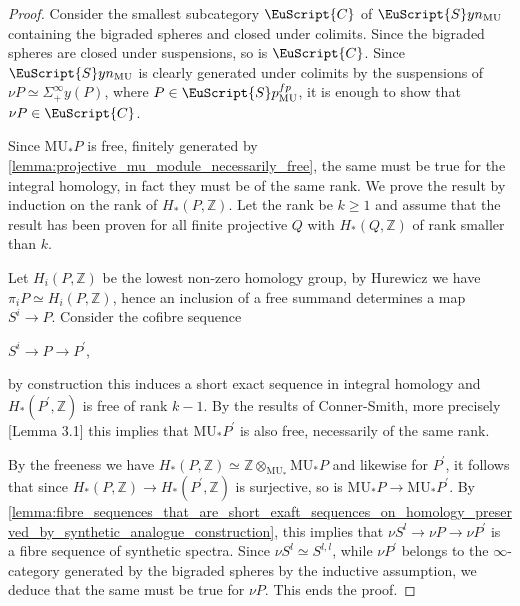 \documentclass[oneside,a4paper]{amsart}
\newcommand{\euscr}[1]{\EuScript{#1}} %
\newcommand{\ccat}{\euscr{C}} %
\newcommand{\MU}{\mathrm{MU}} %
\newcommand{\spectra}{\euscr{S}p} %
\newcommand{\synspectra}{\euscr{S}yn} %
\theoremstyle{plain}
\theoremstyle{definition}
\theoremstyle{remark}
\begin{document}
\begin{proof}
Consider the smallest subcategory $\ccat$ of $\synspectra_{\MU}$ containing the bigraded spheres and closed under colimits. Since the bigraded spheres are closed under suspensions, so is $\ccat$. Since $\synspectra_{\MU}$ is clearly generated under colimits by the suspensions of $\nu P \simeq \Sigma^{\infty}_{+} y(P)$, where $P \in \spectra_{\MU}^{fp}$, it is enough to show that $\nu P \in \ccat$. 

Since $\MU_{*}P$ is free, finitely generated by \cref{lemma:projective_mu_module_necessarily_free}, the same must be true for the integral homology, in fact they must be of the same rank. We prove the result by induction on the rank of $H_{*}(P, \mathbb{Z})$. Let the rank be $k \geq 1$ and assume that the result has been proven for all finite projective $Q$ with $H_{*}(Q, \mathbb{Z})$ of rank smaller than $k$.

Let $H_{i}(P, \mathbb{Z})$ be the lowest non-zero homology group, by Hurewicz we have $\pi_{i}P \simeq H_{i}(P, \mathbb{Z})$, hence an inclusion of a free summand determines a map $S^{i} \rightarrow P$. Consider the cofibre sequence

\begin{center}
$S^{i} \rightarrow P \rightarrow P^{\prime}$,
\end{center}
by construction this induces a short exact sequence in integral homology and $H_{*}(P^{\prime}, \mathbb{Z})$ is free of rank $k-1$. By the results of Conner-Smith, more precisely \cite{conner1969complex}[Lemma 3.1] this implies that $\MU_{*}P^{\prime}$ is also free, necessarily of the same rank. 

By the freeness we have $H_{*}(P, \mathbb{Z}) \simeq \mathbb{Z} \otimes _{\MU_{*}} \MU_{*} P$ and likewise for $P^{\prime}$, it follows that since $H_{*}(P, \mathbb{Z}) \rightarrow H_{*}(P^{\prime}, \mathbb{Z})$ is surjective, so is $\MU_{*}P \rightarrow \MU_{*} P^{\prime}$. By \cref{lemma:fibre_sequences_that_are_short_exaft_sequences_on_homology_preserved_by_synthetic_analogue_construction}, this implies that $\nu S^{l} \rightarrow \nu P \rightarrow \nu P^{\prime}$ is a fibre sequence of synthetic spectra. Since $\nu S^{l} \simeq S^{l, l}$, while $\nu P^{\prime}$ belongs to the $\infty$-category generated by the bigraded spheres by the inductive assumption, we deduce that the same must be true for $\nu P$. This ends the proof. 
\end{proof}
\end{document}
